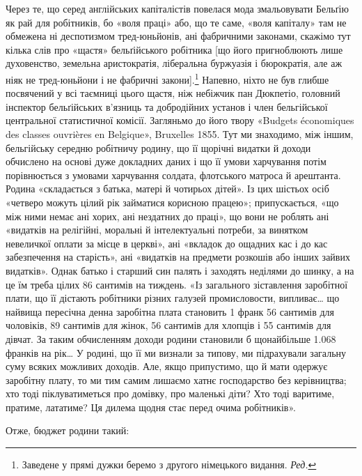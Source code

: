 Через те, що серед англійських капіталістів повелася мода
змальовувати Бельґію як рай для робітників, бо «воля праці»
або, що те саме, «воля капіталу» там не обмежена ні деспотизмом
тред-юньйонів, ані фабричними законами, скажімо тут кілька
слів про «щастя» бельґійського робітника [що його пригноблюють
лише духовенство, земельна аристократія, ліберальна буржуазія
і бюрократія, але аж ніяк не тред-юньйони і не фабричні закони].\footnote*{
Заведене у прямі дужки беремо з другого німецького видання. \emph{Ред.}
}
Напевно, ніхто не був глибше посвячений у всі таємниці
цього щастя, ніж небіжчик пан Дюкпетіо, головний інспектор
бельґійських в’язниць та добродійних установ і член бельгійської
центральної статистичної комісії. Загляньмо до його твору
«Budgets économiques des classes ouvrières en Belgique», Bruxelles
1855. Тут ми знаходимо, між іншим, бельгійську середню
робітничу родину, що її щорічні видатки й доходи обчислено
на основі дуже докладних даних і що її умови харчування потім
порівнюється з умовами харчування солдата, флотського матроса
й арештанта. Родина «складається з батька, матері й чотирьох
дітей». Із цих шістьох осіб «четверо можуть цілий рік займатися
корисною працею»; припускається, «що між ними немає ані
хорих, ані нездатних до праці», що вони не роблять ані «видатків
на релігійні, моральні й інтелектуальні потреби, за винятком
невеличкої оплати за місце в церкві», ані «вкладок до ощадних
кас і до кас забезпечення на старість», ані «видатків на предмети
розкошів або інших зайвих видатків». Однак батько і старший
син палять і заходять неділями до шинку, а на це їм треба цілих
86 сантимів на тиждень. «Із загального зіставлення заробітної
плати, що її дістають робітники різних галузей промисловости,
випливає\dots{} що найвища пересічна денна заробітна плата становить
1 франк 56 сантимів для чоловіків, 89 сантимів для жінок,
56 сантимів для хлопців і 55 сантимів для дівчат. За таким обчисленням
доходи родини становили б щонайбільше \num{1.068} франків
на рік\dots{} У родині, що її ми визнали за типову, ми підрахували
загальну суму всяких можливих доходів. Але, якщо припустимо,
що й мати одержує заробітну плату, то ми тим самим
лишаємо хатнє господарство без керівництва; хто тоді піклуватиметься
про домівку, про маленькі діти? Хто тоді варитиме, пратиме,
лататиме? Ця дилема щодня стає перед очима робітників».

Отже, бюджет родини такий:

